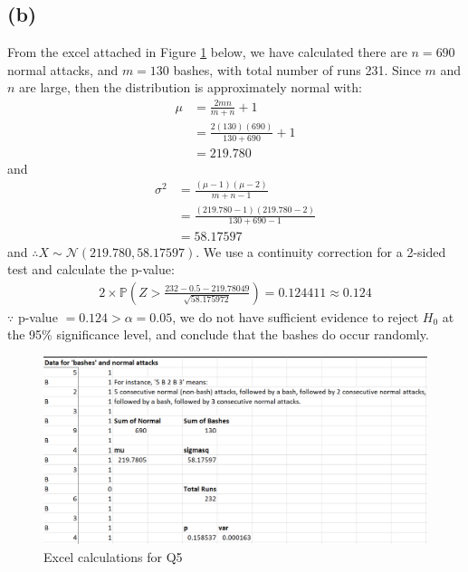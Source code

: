 \documentclass[12pt]{article}
\begin{document}
\subsection*{(b)}

From the excel attached in Figure \ref{fig:5-excel} below, we have calculated there are $n = 690$ normal attacks, and $m=130$ bashes, with total number of runs 231. Since $m$ and $n$ are large, then the distribution is approximately normal with: \begin{align*}
    \mu &= \frac{2mn}{m+n} + 1 \\ 
    &= \frac{2(130)(690)}{130 + 690} + 1 \\ 
    &= 219.780
\end{align*} and \begin{align*}
    \sigma^{2} &= \frac{(\mu - 1)(\mu - 2)}{m+n -1} \\ 
    &= \frac{(219.780-1)(219.780-2)}{130 + 690 - 1} \\ 
    &= 58.17597
\end{align*} and $\therefore X \sim \mathcal{N}(219.780, 58.17597)$. We use a continuity correction for a 2-sided test and calculate the p-value: \begin{align*}
    2 \times \mathbb{P}\left(Z > \frac{232-0.5 -219.78049}{\sqrt{58.175972}}\right) = 0.124411 \approx \boxed{0.124}
\end{align*} $\because$ p-value $= 0.124 > \alpha = 0.05$, we do not have sufficient evidence to reject $H_{0}$ at the 95\% significance level, and conclude that the bashes do occur randomly. 

\begin{figure}[H]
    \centering
    \includegraphics[width=\textwidth]{Images/Q5.png}
    \caption{Excel calculations for Q5}
    \label{fig:5-excel}
\end{figure} 

\newpage
\end{document}
